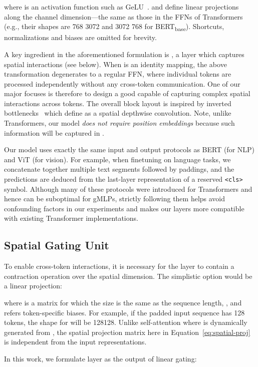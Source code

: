 \documentclass{article}
\newcommand{\gffn}{gMLP\xspace}
\begin{document}
where  is an activation function such as GeLU~\cite{hendrycks2016gaussian}.
 and  define linear projections along the channel dimension---the same as those in the FFNs of Transformers (e.g., their shapes are 768 3072 and 3072 768 for BERT\textsubscript{base}).
Shortcuts, normalizations and biases are omitted for brevity.

A key ingredient in the aforementioned formulation is ,
a layer which captures spatial interactions (see below).
When  is an identity mapping,
the above transformation degenerates to a regular FFN, where individual tokens are processed independently without any cross-token communication.
One of our major focuses
is therefore to design a good  capable of capturing complex spatial interactions across tokens.
The overall block layout is inspired by inverted bottlenecks~\cite{sandler2018mobilenetv2} which define  as a spatial depthwise convolution.
Note, unlike Transformers, our model \emph{does not require position embeddings} because such information will be captured in .

Our model uses exactly the same input and output protocols as BERT (for NLP) and ViT (for vision).
For example,
when finetuning on language tasks, we concatenate together multiple text segments followed by paddings,
and the predictions are deduced from the last-layer representation of a reserved \texttt{<cls>} symbol.
Although many of these protocols were introduced for Transformers and hence can be suboptimal for \gffn{s}, strictly following them helps avoid confounding factors in our experiments and makes our layers more compatible with existing Transformer implementations.


\subsection{Spatial Gating Unit}
\label{subsec:spatial-interaction}
To enable cross-token interactions,
it is necessary for the layer  to contain a contraction operation over the spatial dimension.
The simplistic option would be a linear projection:

where  is a matrix for which the size is the same as the sequence length, , and  refers token-specific biases.
For example, if the padded input sequence has 128 tokens,
the shape for  will be 128128.
Unlike self-attention where  is dynamically generated from ,
the spatial projection matrix  here in Equation~\eqref{eq:spatial-proj} is independent from the input representations.

In this work,
we formulate layer  as the output of linear gating:
\end{document}
